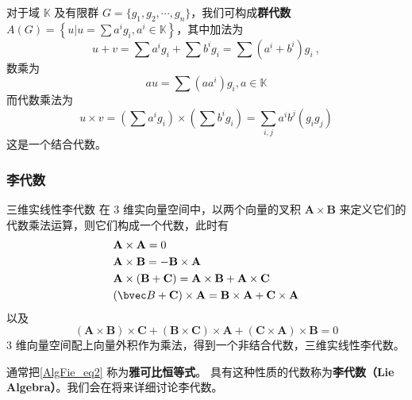 \begin{example}{}
对于域 $\mathbb{K} $ 及有限群 $G=\{g_1,g_2,\cdots,g_n\}$，我们可构成\textbf{群代数}$\displaystyle A(G)=\left\{u | u=\sum a^{i} g_{i}, a^{i} \in \mathbb{K}\right\}$，其中加法为
\begin{equation}
u+v=\sum a^{i} g_{i}+\sum b^{i} g_{i}=\sum\left(a^{i}+b^{i}\right) g_{i}~,
\end{equation}
数乘为
\begin{equation}\label{AlgFie_eq2}
a u=\sum\left(a a^{i}\right) g_{i}, a \in \mathbb{K}
\end{equation}
而代数乘法为
\begin{equation}
u \times v=\left(\sum a^{i} g_{i}\right) \times\left(\sum b^{i} g_{i}\right)=\sum_{i, j} a^{i} b^{j}\left(g_{i} g_{j}\right)
\end{equation}
这是一个结合代数。
\end{example}

\subsubsection{李代数}

\begin{example}{三维实线性李代数}
在 $3$ 维实向量空间中，以两个向量的叉积 $\mathbf A\times \mathbf B$ 来定义它们的代数乘法运算，则它们构成一个代数，此时有
\begin{equation}
\begin{aligned}
&\mathbf{A} \times \mathbf{A}=0\\
&\mathbf{A} \times \mathbf{B}=-\mathbf{B} \times \mathbf{A}\\
&\mathbf{A} \times(\mathbf{B}+\mathbf{C})=\mathbf{A} \times \mathbf{B}+\mathbf{A} \times \mathbf{C}\\
&(\bvec B+\mathbf{C}) \times \mathbf{A}=\mathbf{B} \times \mathbf{A}+\mathbf{C} \times \mathbf{A}
\end{aligned}
\end{equation}
以及
\begin{equation} \label{AlgFie_eq1}
(\mathbf{A} \times \mathbf{B}) \times \mathbf{C}+(\mathbf{B} \times \mathbf{C}) \times \mathbf{A}+(\mathbf{C} \times \mathbf{A}) \times \mathbf{B}=0
\end{equation}
$3$ 维向量空间配上向量外积作为乘法，得到一个非结合代数，三维实线性李代数。
\end{example}

通常把\autoref{AlgFie_eq2}  称为\textbf{雅可比恒等式}。 具有这种性质的代数称为\textbf{李代数（Lie Algebra）}。我们会在将来详细讨论李代数。

